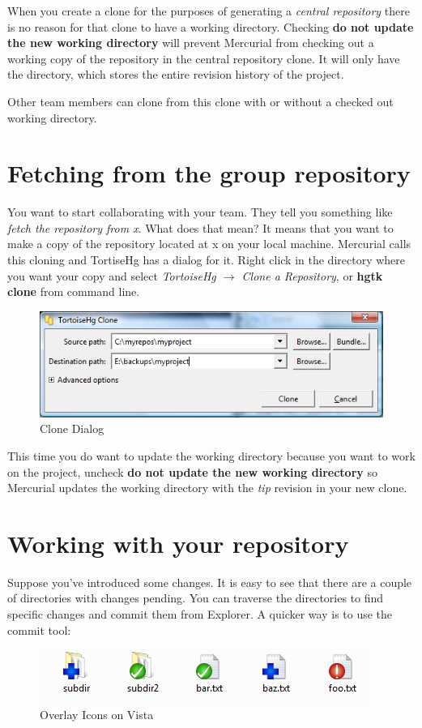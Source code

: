 \documentclass[letterpaper,10pt,english]{manual}
\begin{document}
When you create a clone for the purposes of generating a \emph{central
repository} there is no reason for that clone to have a working
directory. Checking
\textbf{do not update the new working directory} will prevent
Mercurial from checking out a working copy of the repository in the
central repository clone.  It will only have the  directory,
which stores the entire revision history of the project.

Other team members can clone from this clone with or without a checked
out working directory.


\section{Fetching from the group repository}

You want to start collaborating with your team.  They tell you something
like \emph{fetch the repository from x}.  What does that mean? It means that
you want to make a copy of the repository located at x on your local
machine.  Mercurial calls this cloning and TortiseHg has a dialog
for it. Right click in the directory where you want your copy and select
\emph{TortoiseHg \(\rightarrow\) Clone a Repository}, or
\textbf{hgtk clone} from command line.
\begin{figure}[htbp]
\centering

\includegraphics{clone.png}
\caption{Clone Dialog}\end{figure}

This time you do want to update the working directory because you want
to work on the project, uncheck
\textbf{do not update the new working directory} so Mercurial updates
the working directory with the \emph{tip} revision in your new clone.


\section{Working with your repository}

Suppose you've introduced some changes. It is easy to see that there are
a couple of directories with changes pending.  You can traverse the
directories to find specific changes and commit them from Explorer. A
quicker way is to use the commit tool:
\begin{figure}[htbp]
\centering

\includegraphics{overlayicons.png}
\caption{Overlay Icons on Vista}\end{figure}
\end{document}

